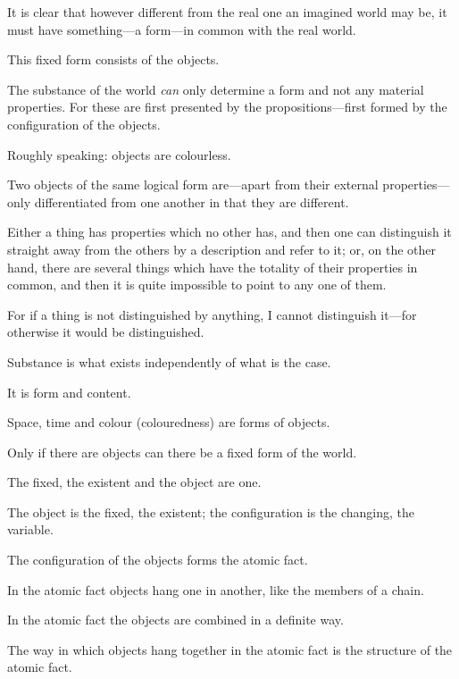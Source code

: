 {It is clear that however different from the real
one an imagined world may be, it must have something---a
form---in common with the real world.}


{This fixed form consists of the objects.}


{The substance of the world \emph{can} only determine
a form and not any material properties. For these
are first presented by the propositions---first formed
by the configuration of the objects.}


{Roughly speaking: objects are colourless.}


{Two objects of the same logical form are---apart
from their external prop\-er\-ties---only differentiated
from one another in that they are
different.}


{Either a thing has properties which no other
has, and then one can distinguish it straight away
from the others by a description and refer to it;
or, on the other hand, there are several things
which have the totality of their properties in
common, and then it is quite impossible to point
to any one of them.

For if a thing is not distinguished by anything,
I cannot distinguish it---for otherwise it would be
distinguished.}


{Substance is what exists independently of what
is the case.}


{It is form and content.}


{Space, time and colour (colouredness) are forms
of objects.}


{Only if there are objects can there be a fixed
form of the world.}


{The fixed, the existent and the object are
one.}


{The object is the fixed, the existent; the configuration
is the changing, the variable.}


{The configuration of the objects forms the
atomic fact.}


{In the atomic fact objects hang one in another,
like the members of a chain.}


{In the atomic fact the objects are combined in
a definite way.}


{The way in which objects hang together in
the atomic fact is the structure of the atomic
fact.}


